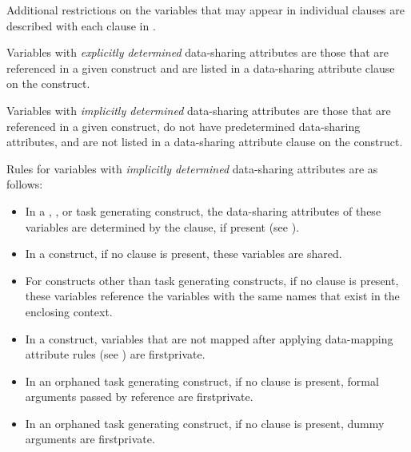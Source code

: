 Additional restrictions on the variables that may appear in individual clauses are
described with each clause in .

Variables with \emph{explicitly determined} data-sharing attributes are those that 
are referenced in a given construct and are listed in a data-sharing attribute clause 
on the construct.

Variables with \emph{implicitly determined} data-sharing attributes are those that 
are referenced in a given construct, do not have predetermined data-sharing 
attributes, and are not listed in a data-sharing attribute clause on the construct.

Rules for variables with \emph{implicitly determined} data-sharing attributes 
are as follows:

\begin{itemize}
\item In a , , or task generating construct, the 
      data-sharing attributes of these variables are determined by the 
       clause, if present (see ).
\item In a  construct, if no  clause is present, 
      these variables are shared.
\item For constructs other than task generating constructs, if no  
      clause is present, these variables reference the variables with the same 
      names that exist in the enclosing context.
\item In a  construct, variables that are not mapped after applying 
      data-mapping attribute rules (see 
      ) 
      are firstprivate.
\end{itemize}

\begin{cppspecific}
\begin{itemize}
\item In an orphaned task generating construct, if no  clause is 
      present, formal arguments passed by reference are firstprivate.
\end{itemize}
\end{cppspecific}

\begin{fortranspecific}
\begin{itemize}
\item In an orphaned task generating construct, if no  clause is 
      present, dummy arguments are firstprivate.
\end{itemize}
\end{fortranspecific}

